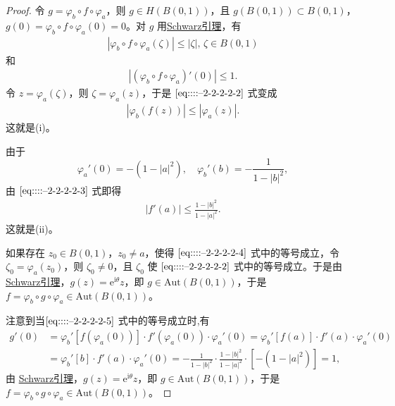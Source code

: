 \documentclass[../../main.tex]{subfiles}%
\begin{document}
\begin{proof}

令 \( g = \varphi_b \circ f \circ \varphi_a \)，则 \( g \in H(B(0,1)) \)，且 \( g(B(0,1)) \subset B(0,1) \)，\( g(0) = \varphi_b \circ f \circ \varphi_a(0) = 0 \)。对 \( g \) 用\hyperref[theorem:Schwarz引理-定理4.5.3]{Schwarz引理}，有
\begin{align}
|\varphi_b \circ f \circ \varphi_a(\zeta)| \leqslant  |\zeta|, \, \zeta \in B(0,1) \label{eq::::--2-2-2-2-2}
\end{align}
和
\begin{align}
|(\varphi_b \circ f \circ \varphi_a)'(0)| \leqslant  1. \label{eq::::--2-2-2-2-3}
\end{align}
令 \( z = \varphi_a(\zeta) \)，则 \( \zeta = \varphi_a(z) \)，于是 \(\eqref{eq::::--2-2-2-2-2}\) 式变成
\begin{align}
|\varphi_b(f(z))| \leqslant  |\varphi_a(z)|. \label{eq::::--2-2-2-2-4}
\end{align}
这就是(i)。

由于
\[
\varphi_a'(0) = - (1 - |a|^2),
\quad
\varphi_b'(b) = - \frac{1}{1 - |b|^2},
\]
由 \(\eqref{eq::::--2-2-2-2-3}\) 式即得
\begin{align}
|f'(a)| \leqslant  \frac{1 - |b|^2}{1 - |a|^2}. \label{eq::::--2-2-2-2-5}
\end{align}
这就是(ii)。

如果存在 \( z_0 \in B(0,1) \)，\( z_0 \neq a \)，使得 \(\eqref{eq::::--2-2-2-2-4}\) 式中的等号成立，令 \( \zeta_0 = \varphi_a(z_0) \)，则 \( \zeta_0 \neq 0 \)，且 \( \zeta_0 \) 使 \(\eqref{eq::::--2-2-2-2-2}\) 式中的等号成立。于是由 \hyperref[theorem:Schwarz引理-定理4.5.3]{Schwarz引理}，\( g(z) = \mathrm{e}^{\mathrm{i}\theta} z \)，即 \( g \in \text{Aut}(B(0,1)) \)，于是 \( f = \varphi_b \circ g \circ \varphi_a \in \text{Aut}(B(0,1)) \)。

注意到当\(\eqref{eq::::--2-2-2-2-5}\) 式中的等号成立时,有
\begin{align*}
g' (0)&=\varphi _{b}'\left[ f\left( \varphi _a\left( 0 \right) \right) \right] \cdot f'\left( \varphi _a\left( 0 \right) \right) \cdot \varphi _{a}'\left( 0 \right) 
=\varphi _{b}'\left[ f\left( a \right) \right] \cdot f' \left( a \right) \cdot \varphi _{a}'\left( 0 \right) 
\\
&=\varphi _{b}'\left[ b \right] \cdot f' \left( a \right) \cdot \varphi _{a}'\left( 0 \right) 
=-\frac{1}{1-|b|^2}\cdot \frac{1-|b|^2}{1-|a|^2}\cdot \left[ -\left( 1-|a|^2 \right) \right] =1,
\end{align*}
由 \hyperref[theorem:Schwarz引理-定理4.5.3]{Schwarz引理}，\( g(z) = \mathrm{e}^{\mathrm{i}\theta} z \)，即 \( g \in \text{Aut}(B(0,1)) \)，于是 \( f = \varphi_b \circ g \circ \varphi_a \in \text{Aut}(B(0,1)) \)。

\end{proof}
\end{document}
